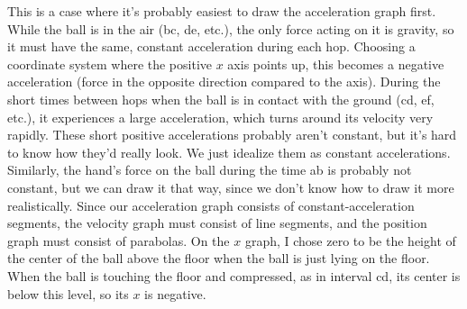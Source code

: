 This is a case where it's probably easiest to draw the
acceleration graph first. While the ball is in the air (bc,
de, etc.), the only force acting on it is gravity, so it
must have the same, constant acceleration during each hop.
Choosing a coordinate system where the positive $x$ axis
points up, this becomes a negative acceleration (force in
the opposite direction compared to the axis). During the
short times between hops when the ball is in contact with
the ground (cd, ef, etc.), it experiences a large acceleration,
which turns around its velocity very rapidly. These short
positive accelerations probably aren't constant, but it's
hard to know how they'd really look. We just idealize them
as constant accelerations. Similarly, the hand's force on
the ball during the time ab is probably not constant, but we
can draw it that way, since we don't know how to draw it
more realistically. Since our acceleration graph consists of
constant-acceleration segments, the velocity graph must
consist of line segments, and the position graph must
consist of parabolas. On the $x$ graph, I chose zero to be
the height of the center of the ball above the floor when
the ball is just lying on the floor. When the ball is
touching the floor and compressed, as in interval cd, its
center is below this level, so its $x$ is negative.





